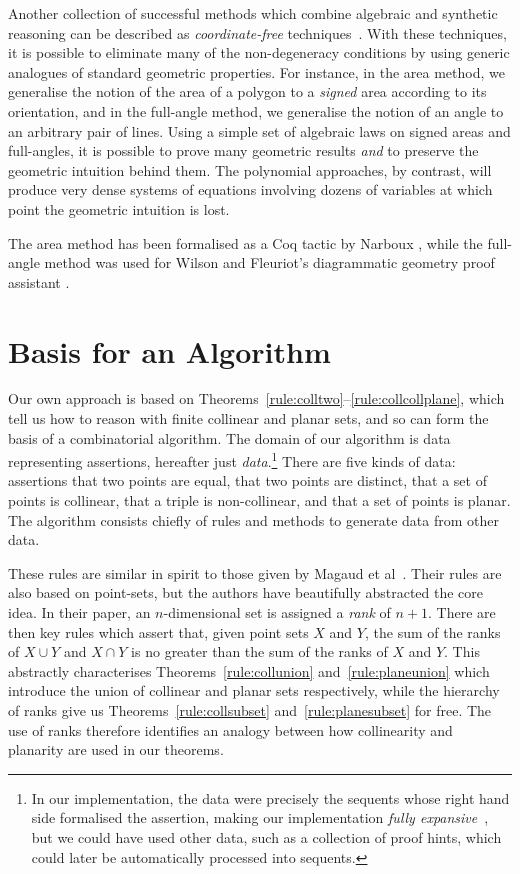 Another collection of successful methods which combine algebraic and synthetic reasoning can be described as \emph{coordinate-free} techniques~\cite{MachineProofsInGeometry}. With these techniques, it is possible to eliminate many of the non-degeneracy conditions by using generic analogues of standard geometric properties. For instance, in the area method, we generalise the notion of the area of a polygon to a \emph{signed} area according to its orientation, and in the full-angle method, we generalise the notion of an angle to an arbitrary pair of lines. Using a simple set of algebraic laws on signed areas and full-angles, it is possible to prove many geometric results \emph{and} to preserve the geometric intuition behind them. The polynomial approaches, by contrast, will produce very dense systems of equations involving dozens of variables at which point the geometric intuition is lost. 

The area method has been formalised as a Coq tactic by Narboux \cite{NarbouxAreaMethod}, while the full-angle method was used for Wilson and Fleuriot's diagrammatic geometry proof assistant \cite{GeometryExplorer}.

\section{Basis for an Algorithm}
Our own approach is based on Theorems~\ref{rule:colltwo}--\ref{rule:collcollplane}, which tell us how to reason with finite collinear and planar sets, and so can form the basis of a combinatorial algorithm. The domain of our algorithm is data representing assertions, hereafter just \emph{data}.\footnote{In our implementation, the data were precisely the sequents whose right hand side formalised the assertion, making our implementation \emph{fully expansive}~\cite{FullyExpansive}, but we could have used other data, such as a collection of proof hints, which could later be automatically processed into sequents.} There are five kinds of data: assertions that two points are equal, that two points are distinct, that a set of points is collinear, that a triple is non-collinear, and that a set of points is planar. The algorithm consists chiefly of rules and methods to generate data from other data.

These rules are similar in spirit to those given by Magaud et al~\cite{RankDesargues}. Their rules are also based on point-sets, but the authors have beautifully abstracted the core idea. In their paper, an $n$-dimensional set is assigned a \emph{rank} of $n+1$. There are then key rules which assert that, given point sets $X$ and $Y$, the sum of the ranks of $X \cup Y$ and $X \cap Y$ is no greater than the sum of the ranks of $X$ and $Y$. This abstractly characterises Theorems~\ref{rule:collunion} and~\ref{rule:planeunion} which introduce the union of collinear and planar sets respectively, while the hierarchy of ranks give us Theorems~\ref{rule:collsubset} and~\ref{rule:planesubset} for free. The use of ranks therefore identifies an analogy between how collinearity and planarity are used in our theorems.

